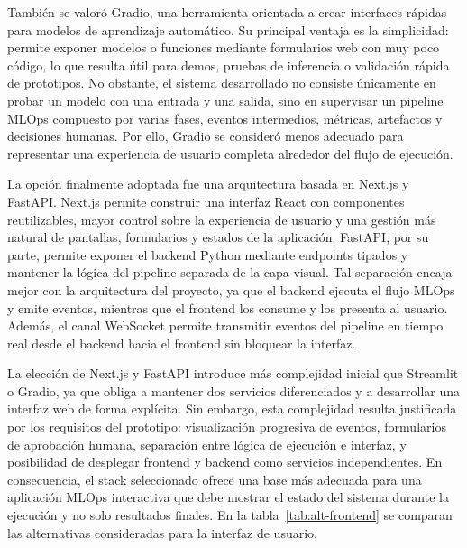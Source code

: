 \documentclass[12pt,a4paper]{article}
\theoremstyle{plain}
\begin{document}
También se valoró Gradio, una herramienta orientada a crear interfaces rápidas para modelos de aprendizaje automático. Su principal ventaja es la simplicidad: permite exponer modelos o funciones mediante formularios web con muy poco código, lo que resulta útil para demos, pruebas de inferencia o validación rápida de prototipos. No obstante, el sistema desarrollado no consiste únicamente en probar un modelo con una entrada y una salida, sino en supervisar un pipeline MLOps compuesto por varias fases, eventos intermedios, métricas, artefactos y decisiones humanas. Por ello, Gradio se consideró menos adecuado para representar una experiencia de usuario completa alrededor del flujo de ejecución.

La opción finalmente adoptada fue una arquitectura basada en Next.js y FastAPI. Next.js permite construir una interfaz React con componentes reutilizables, mayor control sobre la experiencia de usuario y una gestión más natural de pantallas, formularios y estados de la aplicación. FastAPI, por su parte, permite exponer el backend Python mediante endpoints tipados y mantener la lógica del pipeline separada de la capa visual. Tal separación encaja mejor con la arquitectura del proyecto, ya que el backend ejecuta el flujo MLOps y emite eventos, mientras que el frontend los consume y los presenta al usuario. Además, el canal WebSocket permite transmitir eventos del pipeline en tiempo real desde el backend hacia el frontend sin bloquear la interfaz.

La elección de Next.js y FastAPI introduce más complejidad inicial que Streamlit o Gradio, ya que obliga a mantener dos servicios diferenciados y a desarrollar una interfaz web de forma explícita. Sin embargo, esta complejidad resulta justificada por los requisitos del prototipo: visualización progresiva de eventos, formularios de aprobación humana, separación entre lógica de ejecución e interfaz, y posibilidad de desplegar frontend y backend como servicios independientes. En consecuencia, el stack seleccionado ofrece una base más adecuada para una aplicación MLOps interactiva que debe mostrar el estado del sistema durante la ejecución y no solo resultados finales. En la tabla~\ref{tab:alt-frontend} se comparan las alternativas consideradas para la interfaz de usuario. %
\end{document}
